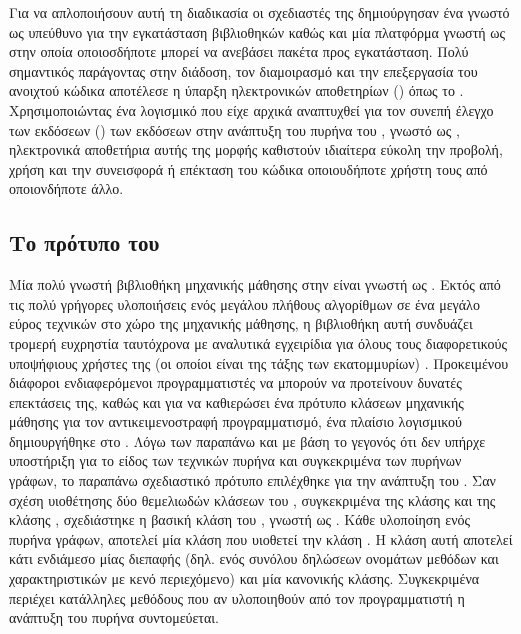 Για να απλοποιήσουν αυτή τη διαδικασία οι σχεδιαστές της  δημιούργησαν ένα  γνωστό ως  υπεύθυνο για την εγκατάσταση βιβλιοθηκών καθώς και μία πλατφόρμα γνωστή ως  στην οποία οποιοσδήποτε μπορεί να ανεβάσει πακέτα προς εγκατάσταση.
Πολύ σημαντικός παράγοντας στην διάδοση, τον διαμοιρασμό και την επεξεργασία του ανοιχτού κώδικα αποτέλεσε η ύπαρξη ηλεκτρονικών αποθετηρίων () όπως το .
Χρησιμοποιώντας ένα λογισμικό που είχε αρχικά αναπτυχθεί για τον συνεπή έλεγχο των εκδόσεων () των εκδόσεων στην ανάπτυξη του πυρήνα του , γνωστό ως , ηλεκτρονικά αποθετήρια αυτής της μορφής καθιστούν ιδιαίτερα εύκολη την προβολή, χρήση και την συνεισφορά ή επέκταση του κώδικα οποιουδήποτε χρήστη τους από οποιονδήποτε άλλο.
\subsection{Το πρότυπο του }
Μία πολύ γνωστή βιβλιοθήκη μηχανικής μάθησης στην  είναι γνωστή ως .
Εκτός από τις πολύ γρήγορες υλοποιήσεις ενός μεγάλου πλήθους αλγορίθμων σε ένα μεγάλο εύρος τεχνικών στο χώρο της μηχανικής μάθησης, η βιβλιοθήκη αυτή συνδυάζει τρομερή ευχρηστία ταυτόχρονα με αναλυτικά εγχειρίδια για όλους τους διαφορετικούς υποψήφιους χρήστες της (οι οποίοι είναι της τάξης των εκατομμυρίων) \cite{scikit}.
Προκειμένου διάφοροι ενδιαφερόμενοι προγραμματιστές να μπορούν να προτείνουν δυνατές επεκτάσεις της, καθώς και για να καθιερώσει ένα πρότυπο κλάσεων μηχανικής μάθησης για τον αντικειμενοστραφή προγραμματισμό, ένα πλαίσιο λογισμικού  δημιουργήθηκε στο .
Λόγω των παραπάνω και με βάση το γεγονός ότι δεν υπήρχε υποστήριξη για το είδος των τεχνικών πυρήνα και συγκεκριμένα των πυρήνων γράφων, το παραπάνω σχεδιαστικό πρότυπο επιλέχθηκε για την ανάπτυξη του .
Σαν σχέση υιοθέτησης δύο θεμελιωδών κλάσεων του \texttt{}, συγκεκριμένα της κλάσης  και της κλάσης , σχεδιάστηκε η βασική κλάση του , γνωστή ως .
Κάθε υλοποίηση ενός πυρήνα γράφων, αποτελεί μία κλάση που υιοθετεί την κλάση . 
Η κλάση αυτή αποτελεί κάτι ενδιάμεσο μίας διεπαφής (δηλ. ενός συνόλου δηλώσεων ονομάτων μεθόδων και χαρακτηριστικών με κενό περιεχόμενο) και μία κανονικής κλάσης.
Συγκεκριμένα περιέχει κατάλληλες μεθόδους που αν υλοποιηθούν από τον προγραμματιστή η ανάπτυξη του πυρήνα συντομεύεται.
